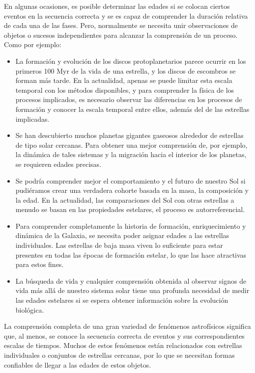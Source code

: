 En algunas ocasiones, es posible determinar las edades si se colocan ciertos eventos en la secuencia correcta y se es capaz de comprender la duración relativa de cada una de las fases. Pero, normalmente se necesita unir observaciones de objetos o sucesos independientes para alcanzar la comprensión de un proceso. Como por ejemplo:
\begin{itemize}
\item La formación y evolución de los discos protoplanetarios parece ocurrir en los primeros 100 Myr de la vida de una estrella, y los discos de escombros se forman más tarde. En la actualidad, apenas se puede limitar esta escala temporal con los métodos disponibles, y para comprender la física de los procesos implicados, es necesario observar las diferencias en los procesos de formación y conocer la escala temporal entre ellos, además del de las estrellas implicadas.
\item Se han descubierto muchos planetas gigantes gaseosos alrededor de estrellas de tipo solar cercanas. Para obtener una mejor comprensión de, por ejemplo, la dinámica de tales sistemas y la migración hacia el interior de los planetas, se requieren edades precisas.
\item Se podría comprender mejor el comportamiento y el futuro de nuestro Sol si pudiéramos crear una verdadera cohorte basada en la masa, la composición y la edad. En la actualidad, las comparaciones del Sol con otras estrellas a menudo se basan en las propiedades estelares, el proceso es autorreferencial.
\item Para comprender completamente la historia de formación, enriquecimiento y dinámica de la Galaxia, se necesita poder asignar edades a las estrellas individuales. Las estrellas de baja masa viven lo suficiente para estar presentes en todas las épocas de formación estelar, lo que las hace atractivas para estos fines.
\item La búsqueda de vida y cualquier comprensión obtenida al observar signos de vida más allá de nuestro sistema solar tiene una profunda necesidad de medir las edades estelares si se espera obtener información sobre la evolución biológica.
\end{itemize}

La comprensión completa de una gran variedad de fenómenos astrofísicos significa que, al menos, se conoce la secuencia correcta de eventos y sus correspondientes escalas de tiempos. Muchos de estos fenómenos están relacionados con estrellas individuales o conjuntos de estrellas cercanas, por lo que se necesitan formas confiables de llegar a las edades de estos objetos.

